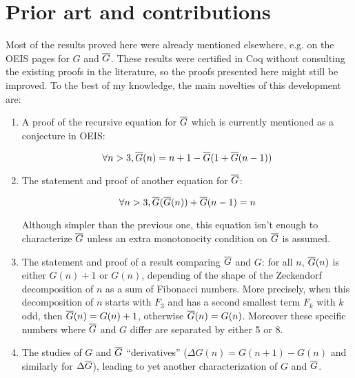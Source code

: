\documentclass[a4paper,11pt]{article}
\begin{document}
\section{Prior art and contributions}
Most of the results proved here were already mentioned elsewhere,
e.g. on the OEIS pages for $G$ and $\overline{G}$. These results were certified
in Coq without consulting the existing proofs in the literature, so
the proofs presented here might still be improved. To the best of
my knowledge, the main novelties of this development are:
\begin{enumerate}
\item
  A proof of the recursive
equation for $\overline{G}$ which is currently mentioned as a conjecture in OEIS:

$$\forall n>3, \overline{G}(n) = n+1 - \overline{G}(1+\overline{G}(n-1))$$

\item
  The statement and proof of another equation for $\overline{G}$:

$$\forall n>3, \overline{G}(\overline{G}(n)) + \overline{G}(n-1) = n$$

Although simpler than the previous one, this equation isn't
enough to characterize $\overline{G}$ unless an extra monotonocity
condition on $\overline{G}$ is assumed.

\item
  The statement and proof of a result comparing $\overline{G}$ and $G$:
for all $n$, $\overline{G}(n)$ is either $G(n)+1$ or $G(n)$, depending
of the shape of the Zeckendorf decomposition of $n$ as a sum
of Fibonacci numbers. More precisely, when this decomposition
of $n$ starts with $F_3$ and has a second smallest term $F_k$
with $k$ odd, then $\overline{G}(n)=G(n)+1$, otherwise $\overline{G}(n)=G(n)$.
Moreover these
specific numbers where $\overline{G}$ and $G$ differ are separated by either
5 or 8.

\item The studies of $G$ and $\overline{G}$ ``derivatives''
  ($\Delta G(n) = G(n+1)-G(n)$ and similarly for $\Delta\overline{G}$),
  leading to yet another characterization of $G$ and $\overline{G}$.

\end{enumerate}
\end{document}
